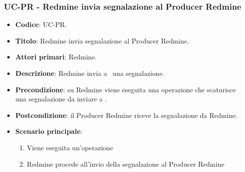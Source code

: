 \subsubsection{UC\theuccount-PR - Redmine invia segnalazione al Producer Redmine}
\begin{itemize}
	\item \textbf{Codice}: UC\theuccount-PR.
	\item \textbf{Titolo}: Redmine invia segnalazione al Producer Redmine.
	\item \textbf{Attori primari}: Redmine.
	\item \textbf{Descrizione}: Redmine invia a \progetto\ una segnalazione.
	\item \textbf{Precondizione}: su Redmine viene eseguita una operazione che scaturisce una
	segnalazione da inviare a \progetto.
	\item \textbf{Postcondizione}: il Producer Redmine riceve la segnalazione da Redmine.
	\item \textbf{Scenario principale}: 
	\begin{enumerate}
		\item Viene eseguita un'operazione
		\item Redmine procede all'invio della segnalazione al Producer Redmine
	\end{enumerate}
	
\end{itemize}


